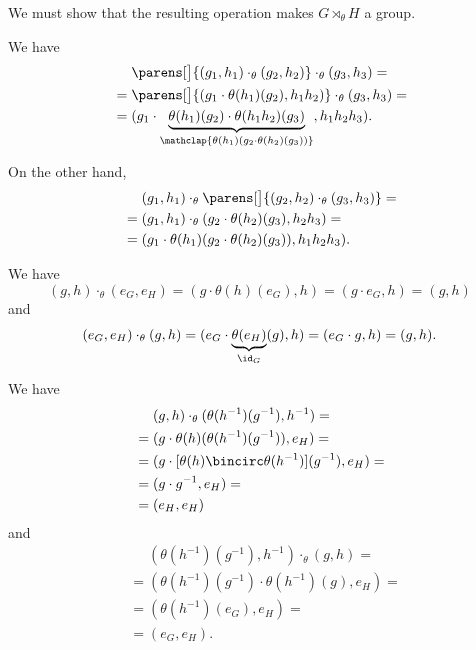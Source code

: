 \begin{defproof}
  We must show that the resulting operation makes \( G \rtimes_\theta H \) a group.

   We have
  \begin{align*}
    &\phantom{{}={}}
    \parens[\big]{ (g_1, h_1) \cdot_\theta (g_2, h_2) } \cdot_\theta (g_3, h_3)
    = \\ &=
    \parens[\big]{ (g_1 \cdot \theta(h_1)(g_2), h_1 h_2) } \cdot_\theta (g_3, h_3)
    = \\ &=
    (g_1 \cdot \underbrace{\theta(h_1)(g_2) \cdot \theta(h_1 h_2)(g_3)}_{\mathclap{\theta(h_1)(g_2 \cdot \theta(h_2)(g_3))}}, h_1 h_2 h_3).
  \end{align*}

  On the other hand,
  \begin{align*}
    &\phantom{{}={}}
    (g_1, h_1) \cdot_\theta \parens[\big]{ (g_2, h_2) \cdot_\theta (g_3, h_3) }
    = \\ &=
    (g_1, h_1) \cdot_\theta (g_2 \cdot \theta(h_2)(g_3), h_2 h_3)
    = \\ &=
    (g_1 \cdot \theta(h_1)(g_2 \cdot \theta(h_2)(g_3)), h_1 h_2 h_3).
  \end{align*}

   We have
  \begin{equation*}
    (g, h) \cdot_\theta (e_G, e_H)
    =
    (g \cdot \theta(h)(e_G), h)
    =
    (g \cdot e_G, h)
    =
    (g, h)
  \end{equation*}
  and
  \begin{equation*}
    (e_G, e_H) \cdot_\theta (g, h)
    =
    (e_G \cdot \underbrace{\theta(e_H)}_{\id_G}(g), h)
    =
    (e_G \cdot g, h)
    =
    (g, h).
  \end{equation*}

   We have
  \begin{align*}
    &\phantom{{}={}}
    (g, h) \cdot_\theta (\theta(h^{-1})(g^{-1}), h^{-1})
    = \\ &=
    (g \cdot \theta(h)(\theta(h^{-1})(g^{-1})), e_H)
    = \\ &=
    (g \cdot [\theta(h) \bincirc \theta(h^{-1})](g^{-1}), e_H)
    = \\ &=
    (g \cdot g^{-1}, e_H)
    = \\ &=
    (e_H, e_H)
  \end{align*}
  and
  \begin{align*}
    &\phantom{{}={}}
    (\theta(h^{-1})(g^{-1}), h^{-1}) \cdot_\theta (g, h)
    = \\ &=
    (\theta(h^{-1})(g^{-1}) \cdot \theta(h^{-1})(g), e_H)
    = \\ &=
    (\theta(h^{-1})(e_G), e_H)
    = \\ &=
    (e_G, e_H).
  \end{align*}
\end{defproof}

